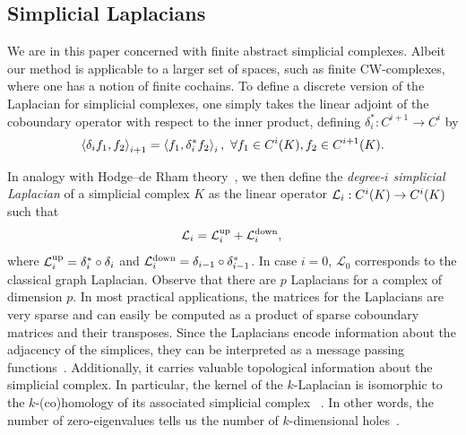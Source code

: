 \subsection{Simplicial Laplacians}
We are in this paper concerned with finite abstract simplicial complexes. Albeit our method is applicable to a larger set of spaces, such as finite CW-complexes, where one has a notion of finite cochains. 
To define a discrete version of the Laplacian for simplicial complexes, one simply takes the linear adjoint of the coboundary operator with respect to the inner product, defining $\delta_i^\ast:C^{i+1}\to C^i$ by
\begin{equation*}
  \left\langle \delta_i f_1 , f_2 \right\rangle_{i+1} =\left\langle f_1 , \delta_i^\ast f_2 \right\rangle_{i},\ \forall f_1\in C^{i}(K), f_2 \in C^{i+1}(K).
\end{equation*}

In analogy with Hodge--de Rham theory~\cite{madsen1997calculus}, we then define the \emph{degree-$i$ simplicial Laplacian} of a simplicial complex $K$ as the linear operator $\mathcal{L}_i:C^i(K)\to C^i(K)$ such that
\begin{equation*}
  \mathcal{L}_i = \mathcal{L}^{\text{up}}_i + \mathcal{L}^{\text{down}}_i,\\
\end{equation*}
where $\mathcal{L}^{\text{up}}_i =  \delta_{i}^\ast\circ\delta_{i}$ and $\mathcal{L}^{\text{down}}_i = \delta_{i-1}\circ\delta_{i-1}^\ast$. In case $i=0$, $\mathcal{L}_0$ corresponds to the classical graph Laplacian. Observe that there are $p$ Laplacians for a complex of dimension $p$. In most practical applications, the matrices for the Laplacians are very sparse and can easily be computed as a product of sparse coboundary matrices and their transposes. Since the Laplacians encode information about the adjacency of the simplices, they can be interpreted as a message passing functions~\cite{gilmer2017NeuralMP}. Additionally, it carries valuable topological information about the simplicial complex. In particular, the kernel of the $k$-Laplacian is isomorphic to the $k$-(co)homology of its associated simplicial complex ~\cite{eckmann1944}. In other words, the number of zero-eigenvalues tells us the number of $k$-dimensional holes~\cite{horak2013spectra}.
